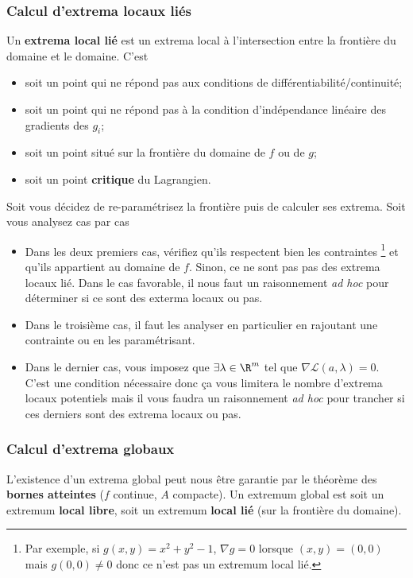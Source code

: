 \subsubsection{Calcul d'extrema locaux liés}
Un \textbf{extrema local lié} est un extrema local à l'intersection entre la frontière du domaine et le domaine.
C'est
\begin{itemize}
	\item soit un point qui ne répond pas aux conditions de différentiabilité/continuité;
	\item soit un point qui ne répond pas à la condition d'indépendance linéaire des gradients des $g_i$;
	\item soit un point situé sur la frontière du domaine de $f$ ou de $g$;
	\item soit un point \textbf{critique} du Lagrangien.
\end{itemize}
Soit vous décidez de re-paramétrisez la frontière puis de calculer ses extrema.
Soit vous analysez cas par cas
\begin{itemize}
	\item Dans les deux premiers cas, vérifiez qu'ils respectent bien les contraintes
		\footnote{Par exemple, si $g(x, y) = x^2 + y^2 - 1$, $\nabla g = 0$ lorsque $(x, y) = (0, 0)$ mais $g(0, 0) \neq 0$ donc ce n'est pas un extremum local lié.}
		et qu'ils appartient au domaine de $f$.
		Sinon, ce ne sont pas pas des extrema locaux lié.
		Dans le cas favorable, il nous faut un raisonnement \emph{ad hoc} pour déterminer si ce sont des exterma locaux ou pas.
	\item Dans le troisième cas, il faut les analyser en particulier en rajoutant une contrainte ou en les paramétrisant.
	\item Dans le dernier cas, vous imposez que $\exists \lambda \in \R^m$ tel que $\nabla \mathcal{L}(a, \lambda) = 0$.
		C'est une condition nécessaire donc ça vous limitera le nombre d'extrema locaux potentiels mais il vous faudra un raisonnement \emph{ad hoc} pour trancher si ces derniers sont des extrema locaux ou pas.
\end{itemize}

\subsubsection{Calcul d'extrema globaux}
L'existence d'un extrema global peut nous être garantie par le théorème des \textbf{bornes atteintes} ($f$ continue, $A$ compacte).
Un extremum global est soit un extremum \textbf{local libre}, soit un extremum \textbf{local lié} (sur la frontière du domaine).

